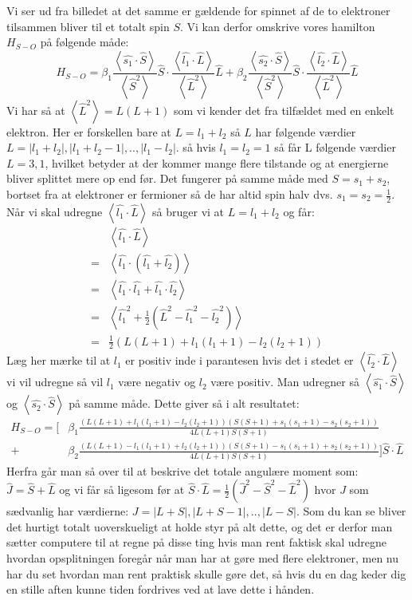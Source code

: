 \documentclass[../../Atom-ogMolekylefysik.tex]{subfiles}
\begin{document}
Vi ser ud fra billedet at det samme er gældende for spinnet af de to elektroner tilsammen bliver til et totalt spin $S$. Vi kan derfor omskrive vores hamilton $H_{S-O}$ på følgende måde:
\begin{equation}
H_{S-O}=\beta_1\frac{\left<\hat{s_1}\cdot\hat{S}\right>}{\left<\hat{S}^2\right>}\hat{S}\cdot\frac{\left<\hat{l_1}\cdot\hat{L}\right>}{\left<\hat{L}^2\right>}\hat{L}+\beta_2\frac{\left<\hat{s_2}\cdot\hat{S}\right>}{\left<\hat{S}^2\right>}\hat{S}\cdot\frac{\left<\hat{l_2}\cdot\hat{L}\right>}{\left<\hat{L}^2\right>}\hat{L}
\end{equation}
Vi har så at $\left<\hat{L}^2\right>=L(L+1)$ som vi kender det fra tilfældet med en enkelt elektron. Her er forskellen bare at $L=l_1+l_2$ så $L$ har følgende værdier $L=|l_1+l_2|, |l_1+l_2-1|,..,|l_1-l_2|$. så hvis $l_1=l_2=1$ så får L følgende værdier $L=3,1$, hvilket betyder at der kommer mange flere tilstande og at energierne bliver splittet mere op end før. Det fungerer på samme måde med $S=s_1+s_2$, bortset fra at elektroner er fermioner så de har altid spin halv dvs. $s_1=s_2=\frac{1}{2}$. 
Når vi skal udregne $\left<\hat{l_1}\cdot\hat{L}\right>$ så bruger vi at $L=l_1+l_2$ og får:
\begin{align*}
    &\left<\hat{l_1}\cdot\hat{L}\right>\\
    =&\left<\hat{l_1}\cdot(\hat{l_1}+\hat{l_2})\right>\\
    =&\left<\hat{l_1}\cdot\hat{l_1}+\hat{l_1}\cdot\hat{l_2}\right>\\
    =&\left<\hat{l_1}^2+\frac{1}{2}\left(\hat{L}^2-\hat{l_1}^2-\hat{l_2}^2 \right)\right>\\
    =&\frac{1}{2}\left(L(L+1)+l_1(l_1+1)-l_2(l_2+1)\right)
\end{align*}
Læg her mærke til at $l_1$ er positiv inde i parantesen hvis det i stedet er $\left<\hat{l_2}\cdot\hat{L}\right>$ vi vil udregne så vil $l_1$ være negativ og $l_2$ være positiv. Man udregner så $\left<\hat{s_1}\cdot\hat{S}\right>$ og $\left<\hat{s_2}\cdot\hat{S}\right>$ på samme måde. Dette giver så i alt resultatet:
\begin{align*}
    H_{S-O}=\Bigg[&\beta_1\frac{(L(L+1)+l_1(l_1+1)-l_2(l_2+1))(S(S+1)+s_1(s_1+1)-s_2(s_2+1))}{4L(L+1)S(S+1)}\\
    +&\beta_2\frac{(L(L+1)-l_1(l_1+1)+l_2(l_2+1))(S(S+1)-s_1(s_1+1)+s_2(s_2+1))}{4L(L+1)S(S+1)}\Bigg]\hat{S}\cdot\hat{L}
\end{align*}
Herfra går man så over til at beskrive det totale angulære moment som: $\hat{J}=\hat{S}+\hat{L}$ og vi får så ligesom før at $\hat{S}\cdot\hat{L}=\frac{1}{2}\left(\hat{J}^2-\hat{S}^2-\hat{L}^2\right)$ hvor $J$ som sædvanlig har værdierne: $J=|L+S|,|L+S-1|,..,|L-S|$.
Som du kan se bliver det hurtigt totalt uoverskueligt at holde styr på alt dette, og det er derfor man sætter computere til at regne på disse ting hvis man rent faktisk skal udregne hvordan opsplitningen foregår når man har at gøre med flere elektroner, men nu har du set hvordan man rent praktisk skulle gøre det, så hvis du en dag keder dig en stille aften kunne tiden fordrives ved at lave dette i hånden.
\end{document}
